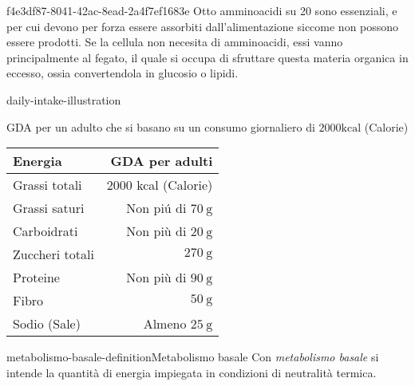 \documentclass[preview]{standalone}
\begin{document}




\begin{snippet}{f4e3df87-8041-42ac-8ead-2a4f7ef1683e}
    Otto amminoacidi su 20 sono essenziali, e per cui devono per forza essere assorbiti dall'alimentazione
siccome non possono essere prodotti. 
Se la cellula non necesita di amminoacidi, essi vanno principalmente al fegato, il quale si occupa
di sfruttare questa materia organica in eccesso, ossia convertendola in glucosio o lipidi.
\end{snippet}


\begin{snippet}{daily-intake-illustration}
    \begin{center}
    GDA per un adulto che si basano su un consumo giornaliero di $2000 \mathrm{kcal}$ (Calorie)
    \begin{tabular}{|l|r|}
    \hline Energia & GDA per adulti \\
    \hline Grassi totali & 2000 kcal (Calorie) \\
    \hline Grassi saturi & Non piú di $70 \mathrm{~g}$ \\
    \hline Carboidrati & Non più di $20 \mathrm{~g}$ \\
    \hline Zuccheri totali & $270 \mathrm{~g}$ \\
    \hline Proteine & Non più di $90 \mathrm{~g}$ \\
    \hline Fibro & $50 \mathrm{~g}$ \\
    \hline Sodio (Sale) & Almeno $25 \mathrm{~g}$ \\
    \hline
    \end{tabular}
    \end{center}
    \phantom{}
\end{snippet}


\begin{snippetdefinition}{metabolismo-basale-definition}{Metabolismo basale}
    Con \textit{metabolismo basale} si intende la quantità di energia impiegata in condizioni di neutralità termica.
\end{snippetdefinition}
\end{document}
